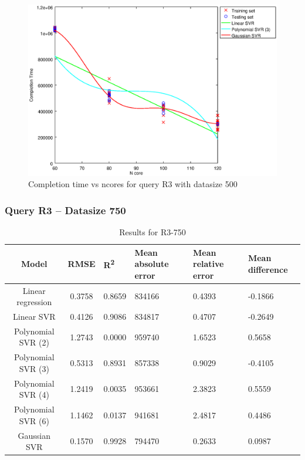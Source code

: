 \documentclass[a4paper,11pt]{article}
\begin{document}
\begin {figure}[hbtp]
\centering
\includegraphics[width=\textwidth]{output/R3_500_ONLY_1_LINEAR_NCORE/plot_R3_500_bestmodels.eps}
\caption{Completion time vs ncores for query R3 with datasize 500}
\label{fig:coreonly_linear_R3_500}
\end {figure}

\newpage
\subsubsection{Query R3 -- Datasize 750}
\begin{table}[H]
	\centering
	\begin{adjustbox}{center}
		\begin{tabular}{c | c M{1.2cm} M{2.5cm} M{2.5cm} M{1.8cm}}
			Model & RMSE & R\textsuperscript{2} & Mean absolute error & Mean relative error & Mean difference \tabularnewline
			\hline
			Linear regression & 0.3758 & 0.8659 & 834166 & 0.4393 & -0.1866 \\
			Linear SVR & 0.4126 & 0.9086 & 834817 & 0.4707 & -0.2649 \\
			Polynomial SVR (2) & 1.2743 & 0.0000 & 959740 & 1.6523 & 0.5658 \\
			Polynomial SVR (3) & 0.5313 & 0.8931 & 857338 & 0.9029 & -0.4105 \\
			Polynomial SVR (4) & 1.2419 & 0.0035 & 953661 & 2.3823 & 0.5559 \\
			Polynomial SVR (6) & 1.1462 & 0.0137 & 941681 & 2.4817 & 0.4486 \\
			Gaussian SVR & 0.1570 & 0.9928 & 794470 & 0.2633 & 0.0987 \\
		\end{tabular}
	\end{adjustbox}
	\\
	\caption{Results for R3-750}
	\label{fig:coreonly_linear_R3_750}
\end{table}
\end{document}
